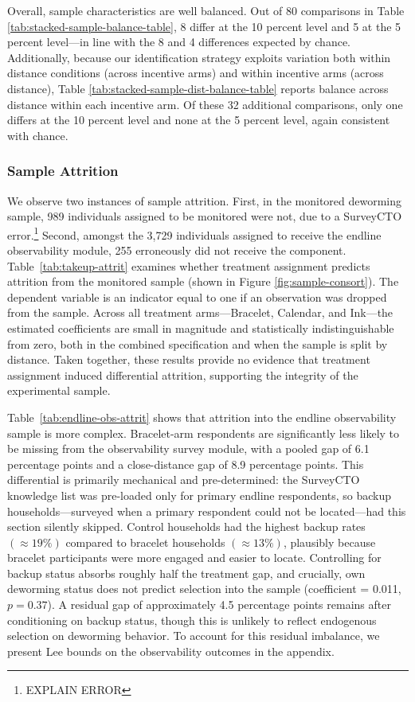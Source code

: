 Overall, sample characteristics are well balanced. Out of 80 comparisons in Table \ref{tab:stacked-sample-balance-table}, 8 differ at the 10 percent level and 5 at the 5 percent level---in line with the 8 and 4 differences expected by chance. Additionally, because our identification strategy exploits variation both within distance conditions (across incentive arms) and within incentive arms (across distance), Table \ref{tab:stacked-sample-dist-balance-table} reports balance across distance within each incentive arm.  Of these 32 additional comparisons, only one differs at the 10 percent level and none at the 5 percent level, again consistent with chance.

\subsubsection{Sample Attrition}
\label{sec:sample-attrit}
We observe two instances of sample attrition. First, in the monitored deworming sample, 989 individuals assigned to be monitored were not, due to a SurveyCTO error.\footnote{EXPLAIN ERROR} Second, amongst the 3,729 individuals assigned to receive the endline observability module, 255 erroneously did not receive the component. Table~\ref{tab:takeup-attrit} examines whether treatment assignment predicts attrition from the monitored sample (shown in Figure \ref{fig:sample-consort}). The dependent variable is an indicator equal to one if an observation was dropped from the sample. Across all treatment arms---Bracelet, Calendar, and Ink---the estimated coefficients are small in magnitude and statistically indistinguishable from zero, both in the combined specification and when the sample is split by distance. Taken together, these results provide no evidence that treatment assignment induced differential attrition, supporting the integrity of the experimental sample.

Table~\ref{tab:endline-obs-attrit} shows that attrition into the endline observability sample is more complex. Bracelet-arm respondents are significantly less likely to be missing from the observability survey module, with a pooled gap of 6.1 percentage points and a close-distance gap of 8.9 percentage points. This differential is primarily mechanical and pre-determined: the SurveyCTO knowledge list was pre-loaded only for primary endline respondents, so backup households---surveyed when a primary respondent could not be located---had this section silently skipped. Control households had the highest backup rates $(\approx19\%)$ compared to bracelet households $(\approx13\%)$, plausibly because bracelet participants were more engaged and easier to locate. Controlling for backup status absorbs roughly half the treatment gap, and crucially, own deworming status does not predict selection into the sample (coefficient = 0.011, $p = 0.37$). A residual gap of approximately 4.5 percentage points remains after conditioning on backup status, though this is unlikely to reflect endogenous selection on deworming behavior. To account for this residual imbalance, we present Lee bounds on the observability outcomes in the appendix.

